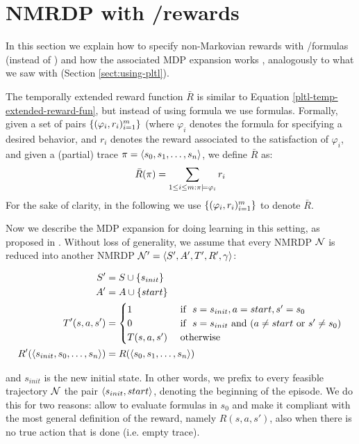 \section{NMRDP with \LTLf/\LDLf rewards}\label{sect:nmrdp-llf-rewards}
In this section we explain how to specify non-Markovian rewards with \LTLf/\LDLf  formulas (instead of \PLTL) and how the associated MDP expansion works \citep{AAAI1817342}, analogously to what we saw with \PLTL (Section \ref{sect:using-pltl}).

The temporally extended reward function $\bar{R}$ is similar to Equation \ref{pltl-temp-extended-reward-fun}, but instead of using \PLTL formula we use \LLf formulas. Formally, given a set of pairs $\{(\varphi_i, r_i)^m_{i=1}\}$ (where $\varphi_i$ denotes the \LLf formula for specifying a desired behavior, and $r_i$ denotes the reward associated to the satisfaction of $\varphi_i$, and given a (partial) trace $\pi = \langle s_0, s_1, \dots, s_n \rangle$, we define $\bar{R}$ as:
\begin{equation}
\bar{R}(\pi) = \sum_{1\le i\le m: \pi \models \varphi_i} r_i
\end{equation}
For the sake of clarity, in the following we use $\{(\varphi_i, r_i)^m_{i=1}\}$ to denote $\bar{R}$.

Now we describe the MDP expansion for doing learning in this setting, as proposed in \citep{AAAI1817342}. 
Without loss of generality, we assume that every NMRDP $\mathcal{N}$ is reduced into another NMRDP $\mathcal{N}'=\langle S', A', T', R', \gamma \rangle$:


\begin{gather}
	\begin{split}
	S' &= S\cup \{s_{init}\}\\
	A' &= A\cup \{start\}\\
	T'(s,a,s')  &=  \begin{cases}
			1 & \ \text{if\ }\  s=s_{init}, a=start, s'=s_0\\
			0 & \ \text{if\ }\  s=s_{init} \ \text{and}\  (a\neq start \ \text{or}\  s'\neq s_0)\\
			T(s, a, s') &  \ \text{otherwise}\ \\
		\end{cases}\\
	R'(\langle s_{init}, s_0, \dots, s_n \rangle) &= R(\langle s_0, s_1, \dots, s_n \rangle)
	\end{split}
	\label{def:nmrdp-with-dummy-initial-state}
\end{gather}

and $s_{init}$ is the new initial state. In other words, we prefix to every feasible trajectory $\mathcal{N}$ the pair $\langle s_{init}, start \rangle$, denoting the beginning of the episode. 
We do this for two reasons: allow to evaluate formulas in $s_0$ and make it compliant with the most general definition of the reward, namely $R(s, a, s')$, also when there is no true action that is done (i.e. empty trace).

